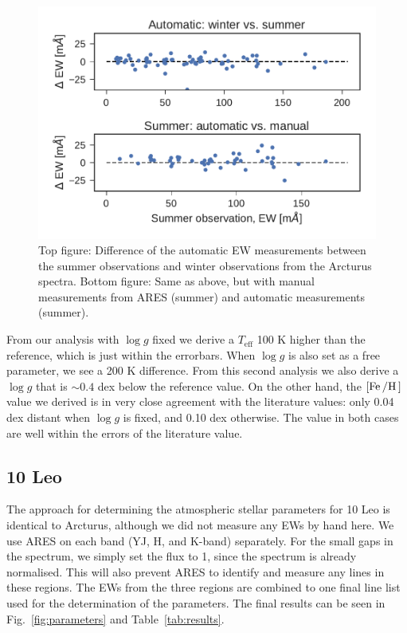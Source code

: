 \documentclass[a4paper,fleqn,usenatbib]{mnras}
\begin{document}
\begin{figure}
    \centering
    \includegraphics[width=1.0\linewidth]{figures/EWcomp.pdf}
    \caption{Top figure: Difference of the automatic EW measurements between the
             summer observations and winter observations from the Arcturus
             spectra. Bottom figure: Same as above, but with manual measurements
             from ARES (summer) and automatic measurements (summer).}
    \label{fig:EWcomp}
\end{figure}


From our analysis with $\log g$ fixed we derive a $T_\mathrm{eff}$ 100 K higher than the 
reference, which is just within the errorbars. When $\log g$ is also set as a free parameter, 
we see a 200 K difference. From this second analysis we also derive a $\log g$ that is $\sim 0.4$ 
dex below the reference value. On the other hand, the $[\ion{Fe}/\ion{H}]$ value we derived is in 
very close agreement with the literature values: only 0.04 dex distant when $\log g$ is fixed, and 
0.10 dex otherwise. The value in both cases are well within the errors of the literature value.


\subsection{10 Leo}
\label{sec:10Leo}

The approach for determining the atmospheric stellar parameters for 10 Leo is identical to Arcturus, although 
we did not measure any EWs by hand here. We use ARES on each band (YJ, H, and K-band)
separately. For the small gaps in the spectrum, we simply set the flux to 1, since the spectrum is
already normalised. This will also prevent ARES to identify and measure any lines in these regions.
The EWs from the three regions are combined to one final line list used for the determination of the
parameters. The final results can be seen in Fig.~\ref{fig:parameters} and Table~\ref{tab:results}.
\end{document}
